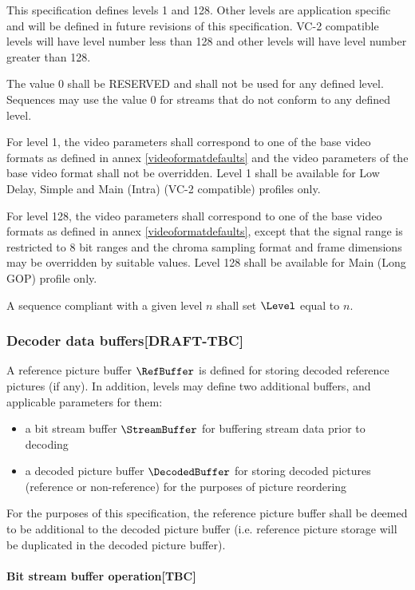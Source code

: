 This specification defines levels 1 and 128. Other levels are application 
specific and will be defined in future revisions of this specification. VC-2
compatible levels will have level number less than 128 and other levels
will have level number greater than 128.

The value 0 shall be RESERVED and shall not be used for any defined level. 
Sequences may use the value 0 for streams that do not conform to any defined level. 

For level 1, the video parameters shall correspond 
to one of the base video formats as defined in annex \ref{videoformatdefaults} 
and the video parameters
of the base video format shall not be overridden. Level 1 shall be available
for Low Delay, Simple and Main (Intra) (VC-2 compatible) profiles only.

For level 128, the video parameters shall correspond to one of the base video
formats as defined in annex \ref{videoformatdefaults}, 
except that the signal range is restricted
to 8 bit ranges and the chroma sampling format and frame dimensions may be
overridden by suitable values. Level 128 shall be available for Main (Long GOP)
profile only.

A sequence compliant with a given level $n$ shall set $\Level$ equal to $n$.

\subsubsection{Decoder data buffers[DRAFT-TBC]}

A reference picture buffer $\RefBuffer$ is defined for storing 
decoded reference pictures (if any). In addition, levels may define
two additional buffers, and applicable parameters for them:

\begin{itemize}
\item a bit stream buffer $\StreamBuffer$ for buffering 
stream data prior to decoding
\item a decoded picture buffer $\DecodedBuffer$ for storing 
decoded pictures (reference or non-reference) for the purposes
of picture reordering
\end{itemize}

For the purposes of this specification, the reference picture 
buffer shall be deemed to be additional to the
decoded picture buffer (i.e. reference picture storage will be
duplicated in the decoded picture buffer).

\paragraph{Bit stream buffer operation[TBC]}$\ $\newline


